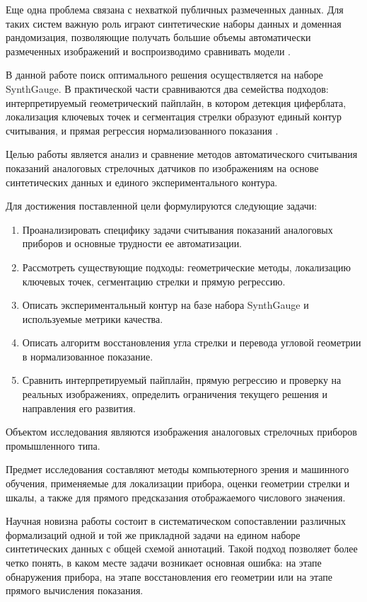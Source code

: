 \documentclass[a4paper,14pt]{extarticle}
\begin{document}
Еще одна проблема связана с нехваткой публичных размеченных данных. Для таких систем важную роль играют синтетические наборы данных и доменная рандомизация, позволяющие получать большие объемы автоматически размеченных изображений и воспроизводимо сравнивать модели \cite{leon2024,tobin2017,horvath2023,blenderproc2020,zhang2019,syntheticReview2022}.

В данной работе поиск оптимального решения осуществляется на наборе SynthGauge. В практической части сравниваются два семейства подходов: интерпретируемый геометрический пайплайн, в котором детекция циферблата, локализация ключевых точек и сегментация стрелки образуют единый контур считывания, и прямая регрессия нормализованного показания \cite{howells2021,leon2024,reitsma2024,sciRep2025,meterRegression2024}.

	Целью работы является анализ и сравнение методов автоматического считывания показаний аналоговых стрелочных датчиков по изображениям на основе синтетических данных и единого экспериментального контура.

	Для достижения поставленной цели формулируются следующие задачи:

\begin{enumerate}[leftmargin=1.5cm]
	\item Проанализировать специфику задачи считывания показаний аналоговых приборов и основные трудности ее автоматизации.
	\item Рассмотреть существующие подходы: геометрические методы, локализацию ключевых точек, сегментацию стрелки и прямую регрессию.
	\item Описать экспериментальный контур на базе набора SynthGauge и используемые метрики качества.
	\item Описать алгоритм восстановления угла стрелки и перевода угловой геометрии в нормализованное показание.
	\item Сравнить интерпретируемый пайплайн, прямую регрессию и проверку на реальных изображениях, определить ограничения текущего решения и направления его развития.
\end{enumerate}

	Объектом исследования являются изображения аналоговых стрелочных приборов промышленного типа.

	Предмет исследования составляют методы компьютерного зрения и машинного обучения, применяемые для локализации прибора, оценки геометрии стрелки и шкалы, а также для прямого предсказания отображаемого числового значения.

	Научная новизна работы состоит в систематическом сопоставлении различных формализаций одной и той же прикладной задачи на едином наборе синтетических данных с общей схемой аннотаций. Такой подход позволяет более четко понять, в каком месте задачи возникает основная ошибка: на этапе обнаружения прибора, на этапе восстановления его геометрии или на этапе прямого вычисления показания.
\end{document}
